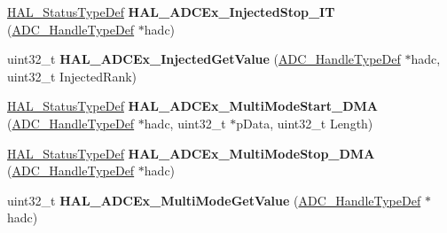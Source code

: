 \begin{DoxyCompactItemize}
\item 
\hyperlink{stm32f4xx__hal__def_8h_a63c0679d1cb8b8c684fbb0632743478f}{H\+A\+L\+\_\+\+Status\+Type\+Def} {\bfseries H\+A\+L\+\_\+\+A\+D\+C\+Ex\+\_\+\+Injected\+Stop\+\_\+\+IT} (\hyperlink{struct_a_d_c___handle_type_def}{A\+D\+C\+\_\+\+Handle\+Type\+Def} $\ast$hadc)\hypertarget{group___a_d_c_ex___exported___functions___group1_gae032f41136f4dc4b3f3c2476b96a21f5}{}\label{group___a_d_c_ex___exported___functions___group1_gae032f41136f4dc4b3f3c2476b96a21f5}

\item 
uint32\+\_\+t {\bfseries H\+A\+L\+\_\+\+A\+D\+C\+Ex\+\_\+\+Injected\+Get\+Value} (\hyperlink{struct_a_d_c___handle_type_def}{A\+D\+C\+\_\+\+Handle\+Type\+Def} $\ast$hadc, uint32\+\_\+t Injected\+Rank)\hypertarget{group___a_d_c_ex___exported___functions___group1_ga7996668b61263f91c76d5f55551f3a07}{}\label{group___a_d_c_ex___exported___functions___group1_ga7996668b61263f91c76d5f55551f3a07}

\item 
\hyperlink{stm32f4xx__hal__def_8h_a63c0679d1cb8b8c684fbb0632743478f}{H\+A\+L\+\_\+\+Status\+Type\+Def} {\bfseries H\+A\+L\+\_\+\+A\+D\+C\+Ex\+\_\+\+Multi\+Mode\+Start\+\_\+\+D\+MA} (\hyperlink{struct_a_d_c___handle_type_def}{A\+D\+C\+\_\+\+Handle\+Type\+Def} $\ast$hadc, uint32\+\_\+t $\ast$p\+Data, uint32\+\_\+t Length)\hypertarget{group___a_d_c_ex___exported___functions___group1_gab36a3508a06430d7c7d0def79ec61b08}{}\label{group___a_d_c_ex___exported___functions___group1_gab36a3508a06430d7c7d0def79ec61b08}

\item 
\hyperlink{stm32f4xx__hal__def_8h_a63c0679d1cb8b8c684fbb0632743478f}{H\+A\+L\+\_\+\+Status\+Type\+Def} {\bfseries H\+A\+L\+\_\+\+A\+D\+C\+Ex\+\_\+\+Multi\+Mode\+Stop\+\_\+\+D\+MA} (\hyperlink{struct_a_d_c___handle_type_def}{A\+D\+C\+\_\+\+Handle\+Type\+Def} $\ast$hadc)\hypertarget{group___a_d_c_ex___exported___functions___group1_ga6a114ff60985be225d621a5c3be8ddf2}{}\label{group___a_d_c_ex___exported___functions___group1_ga6a114ff60985be225d621a5c3be8ddf2}

\item 
uint32\+\_\+t {\bfseries H\+A\+L\+\_\+\+A\+D\+C\+Ex\+\_\+\+Multi\+Mode\+Get\+Value} (\hyperlink{struct_a_d_c___handle_type_def}{A\+D\+C\+\_\+\+Handle\+Type\+Def} $\ast$hadc)\hypertarget{group___a_d_c_ex___exported___functions___group1_ga5ab7c06d2f0b5f9de1f86de5713d68d2}{}\label{group___a_d_c_ex___exported___functions___group1_ga5ab7c06d2f0b5f9de1f86de5713d68d2}


\end{DoxyCompactItemize}
